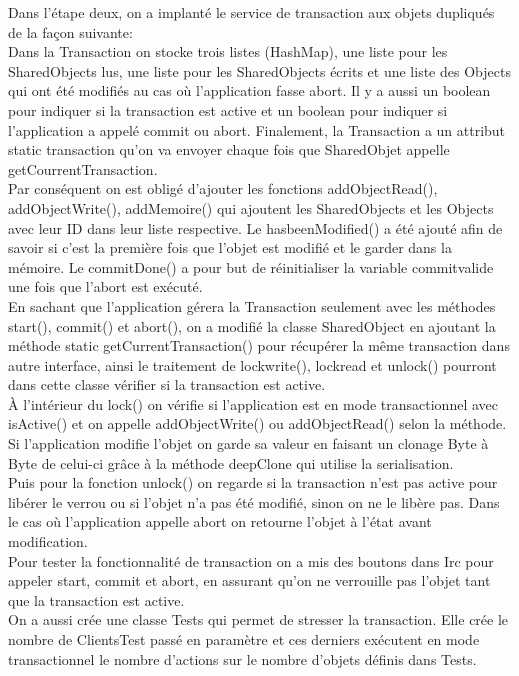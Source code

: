\documentclass[a4paper,12pt]{article}
\begin{document}
Dans l’étape deux,  on a implanté le service de transaction aux objets dupliqués de la façon suivante:\\

Dans la Transaction on stocke trois listes (HashMap), une liste pour les SharedObjects lus, une liste pour les SharedObjects écrits et une liste des Objects qui ont été modifiés au cas où l’application fasse abort. Il y a aussi un boolean pour indiquer si la transaction est active et un boolean pour indiquer si l’application a appelé commit ou abort. Finalement, la Transaction a un attribut static transaction qu'on va envoyer chaque fois que SharedObjet appelle getCourrentTransaction. \\

Par conséquent on est obligé d'ajouter les fonctions addObjectRead(), addObjectWrite(), addMemoire() qui ajoutent les SharedObjects et les Objects avec leur ID dans leur liste respective. Le hasbeenModified() a été ajouté afin de savoir si c’est la première fois que l’objet est modifié et le garder dans la mémoire. Le commitDone() a pour but de réinitialiser la variable commitvalide une fois que l’abort est exécuté. \\

En sachant que l’application gérera la Transaction seulement avec les méthodes start(), commit() et abort(), on a modifié la classe SharedObject en ajoutant la méthode static getCurrentTransaction() pour récupérer la même transaction dans autre interface, ainsi le traitement de lockwrite(), lockread et unlock() pourront dans cette classe vérifier si la transaction est active.\\

À l’intérieur du lock() on vérifie si l’application est en mode transactionnel avec isActive() et  on appelle addObjectWrite() ou addObjectRead() selon la méthode. Si l’application modifie l’objet on garde sa valeur en faisant un clonage Byte à Byte de celui-ci grâce à la méthode deepClone qui utilise la serialisation. \\

Puis pour la fonction unlock() on regarde si la transaction n’est pas active pour libérer le verrou ou si l’objet n’a pas été modifié, sinon on ne le libère pas. Dans le cas où l’application appelle abort on retourne l’objet à l’état avant modification.\\

Pour tester la fonctionnalité de transaction on a mis des boutons dans Irc pour appeler start, commit et abort, en assurant qu’on ne verrouille pas l’objet tant que la transaction est active. \\
On a aussi crée une classe Tests qui permet de stresser la transaction. Elle crée le nombre de ClientsTest passé en paramètre et ces derniers exécutent en mode transactionnel le nombre d'actions sur le nombre d'objets définis dans Tests.
\end{document}
